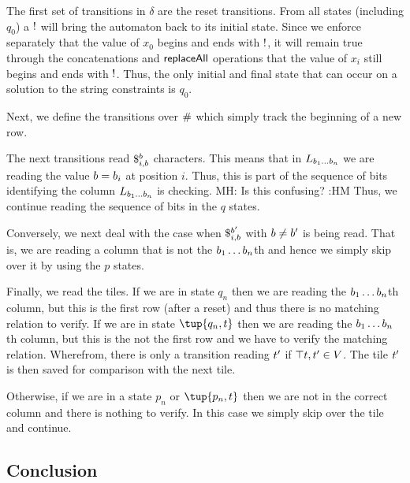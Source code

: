 \documentclass{article}
\newcommand{\mat}[1]{\color{cyan} {MH: #1 :HM} \color{black}}
\begin{document}
The first set of transitions in $\delta$ are the reset transitions.
From all states (including $q_0$) a $\resetchar$ will bring the automaton back to its initial state.
Since we enforce separately that the value of $x_0$ begins and ends with $\resetchar$, it will remain true through the concatenations and $\replaceall$ operations that the value of $x_i$ still begins and ends with $\resetchar$.
Thus, the only initial and final state that can occur on a solution to the string constraints is $q_0$.

Next, we define the transitions over $\rowdelim$ which simply track the beginning of a new row.

The next transitions read
$\repl{i}{\bit}{\bit}$
characters.
This means that in
$L_{\bit_1 \ldots \bit_n}$
we are reading the value $\bit = \bit_i$ at position $i$.
Thus, this is part of the sequence of bits identifying the column
$L_{\bit_1 \ldots \bit_n}$
is checking.
\mat{Is this confusing?}
Thus, we continue reading the sequence of bits in the $q$ states.

Conversely, we next deal with the case when
$\repl{i}{\bit}{\bit'}$
with $\bit \neq \bit'$ is being read.
That is, we are reading a column that is not the
$\bit_1\ldots\bit_n$th
and hence we simply skip over it by using the $p$ states.

Finally, we read the tiles.
If we are in state $q_n$ then we are reading the
$\bit_1\ldots\bit_n$th
column, but this is the first row (after a reset) and thus there is no matching relation to verify.
If we are in state $\tup{q_n, \tile}$ then we are reading the
$\bit_1\ldots\bit_n$th
column, but this is the not the first row and we have to verify the matching relation.
Wherefrom, there is only a transition reading $\tile'$ if
$\top{\tile, \tile'} \in \vcons$.
The tile $\tile'$ is then saved for comparison with the next tile.

Otherwise, if we are in a state $p_n$ or $\tup{p_n, \tile}$ then we are not in the correct column and there is nothing to verify.
In this case we simply skip over the tile and continue.


\subsection{Conclusion}
\end{document}
